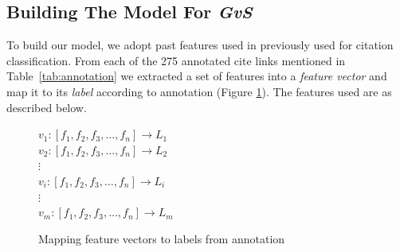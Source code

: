 \subsection*{Building The Model For {\it GvS}}
To build our model, we adopt past features used in  previously used for citation classification. From each of the 275 annotated cite links mentioned in Table~\ref{tab:annotation} we extracted a set of features into a {\it feature vector} and map it to its {\it label} according to annotation (Figure \ref{fig:featurevector}). The features used are as described below.

\begin{figure}[h]
\centering
$v_1:[f_1, f_2, f_3, \ldots, f_n] \rightarrow L_1$ \\
$v_2:[f_1, f_2, f_3, \ldots, f_n] \rightarrow L_2$ \\
$\vdots$ \\
$v_i:[f_1, f_2, f_3, \ldots, f_n] \rightarrow L_i$ \\
$\vdots$ \\
$v_m:[f_1, f_2, f_3, \ldots, f_n] \rightarrow L_m$
\caption{Mapping feature vectors to labels from annotation}
\label{fig:featurevector}
\end{figure}

